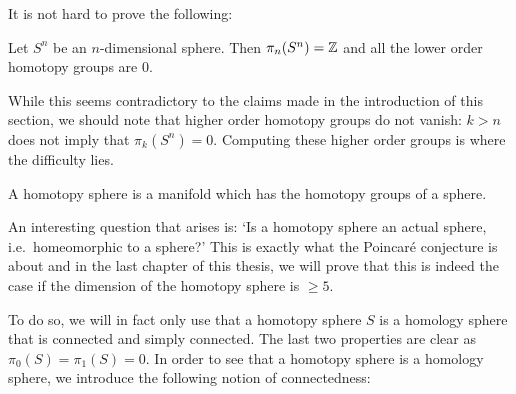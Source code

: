 It is not hard to prove the following:
\begin{prop}
    Let $S^{n}$ be an $n$-dimensional sphere.
    Then $\pi_n(S^{n}) = \mathbb{Z}$ and all the lower order homotopy groups are $0$.
\end{prop}
While this seems contradictory to the claims made in the introduction of this section, we should note that higher order homotopy groups do not vanish: $k > n$ does not imply that $\pi_k(S^{n}) = 0$.
Computing these higher order groups is where the difficulty lies.

\begin{definition}
    A homotopy sphere is a manifold which has the homotopy groups of a sphere.
\end{definition}

An interesting question that arises is: `Is a homotopy sphere an actual sphere, i.e.\ homeomorphic to a sphere?' This is exactly what the Poincaré conjecture is about and in the last chapter of this thesis, we will prove that this is indeed the case if the dimension of the homotopy sphere is $\ge 5$.

To do so, we will in fact only use that a homotopy sphere $S$ is a homology sphere that is connected and simply connected.
The last two properties are clear as $\pi_0(S) = \pi_1(S) = 0$.
In order to see that a homotopy sphere is a homology sphere, we introduce the following notion of connectedness:

